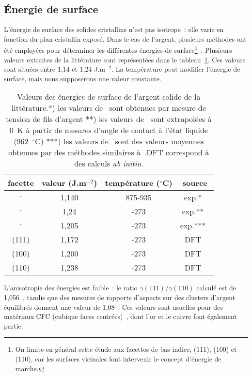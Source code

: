 	\subsection{Énergie de surface}
L'énergie de surface des solides cristallins n'est pas isotrope~: elle varie en fonction du plan cristallin exposé. Dans le cas de l'argent, plusieurs méthodes ont été employées pour déterminer les différentes énergies de surface\footnote{On limite en général cette étude aux facettes de bas indice, (111), (100) et (110), car les surfaces vicinales font intervenir le concept d'énergie de marche.}~\cite{stankic2013equilibrium,vitos1998surface}. Plusieurs valeurs extraites de la littérature sont représentées dans le tableau~\ref{tEnergies}. Ces valeurs sont situées entre 1,14 et 1,24 J.m$^{-2}$. La température peut modifier l'énergie de surface, mais nous supposerons une valeur constante.\par 
\begin{table}
\centering
\begin{tabular}{cccc}
\hline
facette & valeur (J.m$^{-2}$) & température ($^\circ$C) & source\\
\hline
$\cdot$ & 1,140 & 875-935 & exp.*~\cite{buttner1952adsorption}\\
$\cdot$ & 1,24 & -273 & exp.**~\cite{tyson1977surface}\\
$\cdot$ & 1,205 & -273 & exp.***~\cite{kumikov1983measurement}\\
(111) & 1,172 & -273 & DFT~\cite{vitos1998surface}\\
(100) & 1,200 & -273 & DFT~\cite{vitos1998surface}\\
(110) & 1,238 & -273 & DFT~\cite{vitos1998surface}\\
\hline
\end{tabular}
\caption{Valeurs des énergies de surface de l'argent solide de la littérature.*) les valeurs de~\cite{buttner1952adsorption} sont obtenues par mesure de tension de fils d'argent **) les valeurs de~\cite{tyson1977surface} sont extrapolées à 0~K à partir de mesures d'angle de contact à l'état liquide (962~$^\circ$C) ***) les valeurs de~\cite{kumikov1983measurement} sont des valeurs moyennes obtenues par des méthodes similaires à~\cite{buttner1952adsorption}.\og DFT \fg{} correspond à des calculs \textit{ab initio}. }
\label{tEnergies}
\end{table}
L'anisotropie des énergies est faible~: le ratio  $\gamma(111)/\gamma(110)$ calculé est de 1,056~\cite{vitos1998surface}, tandis que des mesures de rapports d'aspects sur des clusters d'argent équilibrés donnent une valeur de 1,08~\cite{stankic2013equilibrium}. Ces valeurs sont usuelles pour des matériaux CFC (cubique faces centrées)~\cite{sundquist1964direct}, dont l'or et le cuivre font également partie.\par
